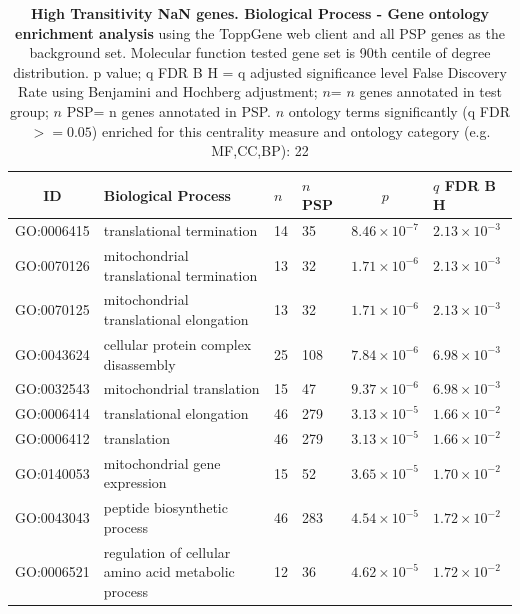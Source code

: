   \begin{table}[ht]
\centering
\begin{adjustbox}{width=\textwidth}
\setlength{\extrarowheight}{2pt}
\begin{tabular}{@{}clllcl@{}}
  \toprule
  ID & Biological Process & $n$ & $n$ PSP & $p$ & $q$ FDR B H \\ 

  \midrule
GO:0006415 & translational termination & 14 & 35 & $8.46 \times 10^{-7}$ & $2.13 \times 10^{-3}$ \\ 
  GO:0070126 & mitochondrial translational termination & 13 & 32 & $1.71 \times 10^{-6}$ & $2.13 \times 10^{-3}$ \\ 
  GO:0070125 & mitochondrial translational elongation & 13 & 32 & $1.71 \times 10^{-6}$ & $2.13 \times 10^{-3}$ \\ 
  GO:0043624 & cellular protein complex disassembly & 25 & 108 & $7.84 \times 10^{-6}$ & $6.98 \times 10^{-3}$ \\ 
  GO:0032543 & mitochondrial translation & 15 & 47 & $9.37 \times 10^{-6}$ & $6.98 \times 10^{-3}$ \\ 
  GO:0006414 & translational elongation & 46 & 279 & $3.13 \times 10^{-5}$ & $1.66 \times 10^{-2}$ \\ 
  GO:0006412 & translation & 46 & 279 & $3.13 \times 10^{-5}$ & $1.66 \times 10^{-2}$ \\ 
  GO:0140053 & mitochondrial gene expression & 15 & 52 & $3.65 \times 10^{-5}$ & $1.70 \times 10^{-2}$ \\ 
  GO:0043043 & peptide biosynthetic process & 46 & 283 & $4.54 \times 10^{-5}$ & $1.72 \times 10^{-2}$ \\ 
  GO:0006521 & regulation of cellular amino acid metabolic process & 12 & 36 & $4.62 \times 10^{-5}$ & $1.72 \times 10^{-2}$ \\ 
   \bottomrule
\end{tabular}
\end{adjustbox}
\caption[Gene ontology enrichment High Transitivity NaN genes Biological Process of genes above 90th centile of distribution]{\textbf{High Transitivity NaN genes. Biological Process - Gene ontology enrichment analysis} using the ToppGene web client and all PSP genes as the background set.  Molecular function tested gene set is 90th centile of degree distribution.  p value; q FDR B H = q adjusted significance level False Discovery Rate using Benjamini and Hochberg adjustment; $n$= $n$ genes annotated in test group; $n$ PSP= n genes annotated in PSP. $n$ ontology terms significantly (q FDR$>=0.05$) enriched for this centrality measure and ontology category (e.g. MF,CC,BP): 22} 
\label{tab:ToppGENE GO: Biological Process. tra 90 centile NA narm cwpsp.txtp = p value; q FDR B H = q adjusted significance level False Discovery Rate using Benjamini and Hochberg adjustment; n= n genes annotated in test group; n PSP= n genes annotated in PSP. n significant in category 22}
\end{table}

